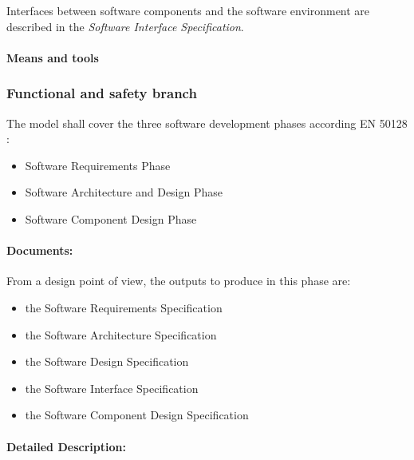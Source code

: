  Interfaces between software components and the software environment are described in the \emph{Software Interface Specification}.



\paragraph{Means and tools}
\label{sec:sw-means}

\begin{comment}
To be completed according requirement of EN50128  and D2.6
Use of formal methods to describe.
To each level shall be develop the semi-formal model ?

\end{comment}

\subsubsection{Functional and safety branch}


The model shall cover the three software development phases according EN 50128 :

\begin{itemize}
\item Software Requirements Phase
\item Software Architecture and Design Phase
\item Software Component Design Phase
\end{itemize}

\paragraph{Documents:}
\label{sec:sw-req-documents}
From a design point of view, the outputs to produce in this phase are:

\begin{itemize}
\item the Software Requirements Specification
\item the Software Architecture Specification
\item the Software Design Specification
\item the Software Interface Specification
\item the Software Component Design Specification
\end{itemize}



\paragraph{Detailed Description:}
\label{sec:sw-req-deta-descr}

